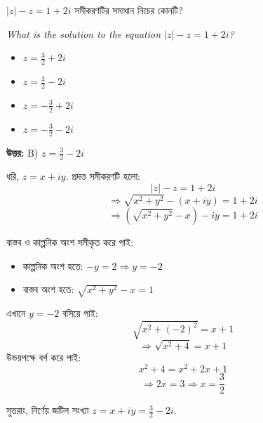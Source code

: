 \documentclass[12pt, a4paper]{article}
\begin{document}
\begin{tcolorbox}[questionbox={প্রশ্ন (Question) 1}]
    \noindent
    $|z| - z = 1 + 2i$ সমীকরণটির সমাধান নিচের কোনটি?
    
    \vspace{0.8em}
    \begin{english}
    \noindent\textit{\color{darkgray}
    What is the solution to the equation $|z| - z = 1 + 2i$?
    }
    \end{english}
\end{tcolorbox}

\begin{itemize}[label={}, leftmargin=1cm, itemsep=0.5em]
    \item[\textbf{A)}] $z = \frac{3}{2} + 2i$
    \item[\textbf{B)}] $z = \frac{3}{2} - 2i$
    \item[\textbf{C)}] $z = -\frac{3}{2} + 2i$
    \item[\textbf{D)}] $z = -\frac{3}{2} - 2i$
\end{itemize}

\vspace{0.5em}
\begin{tcolorbox}[answerbox]
    \textbf{\color{success} উত্তর:} B) $z = \frac{3}{2} - 2i$
\end{tcolorbox}
\vspace{1em}

\begin{tcolorbox}[solutionbox={সমাধান (Solution)}]
    \noindent
    ধরি, $z = x + iy$. প্রদত্ত সমীকরণটি হলো:
    \[ |z| - z = 1 + 2i \]
    \[ \Rightarrow \sqrt{x^2+y^2} - (x+iy) = 1 + 2i \]
    \[ \Rightarrow (\sqrt{x^2+y^2} - x) - iy = 1 + 2i \]
    
    \vspace{0.5em}
    বাস্তব ও কাল্পনিক অংশ সমীকৃত করে পাই:
    \begin{itemize}
        \item কাল্পনিক অংশ হতে: $-y = 2 \Rightarrow y = -2$
        \item বাস্তব অংশ হতে: $\sqrt{x^2+y^2} - x = 1$
    \end{itemize}
    
    \vspace{0.5em}
    এখানে $y = -2$ বসিয়ে পাই:
    \[ \sqrt{x^2+(-2)^2} = x + 1 \]
    \[ \Rightarrow \sqrt{x^2+4} = x + 1 \]
    উভয়পক্ষে বর্গ করে পাই:
    \[ x^2 + 4 = x^2 + 2x + 1 \]
    \[ \Rightarrow 2x = 3 \Rightarrow x = \frac{3}{2} \]
    
    \vspace{0.5em}
    সুতরাং, নির্ণেয় জটিল সংখ্যা $z = x + iy = \frac{3}{2} - 2i$.
\end{tcolorbox}
\vspace{1em}
\end{document}
